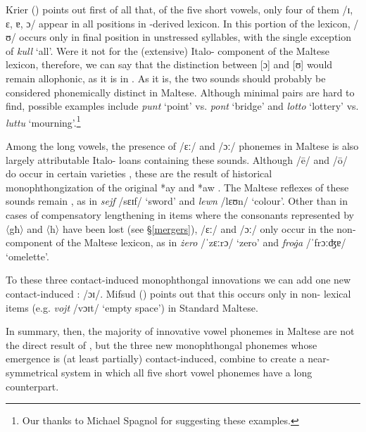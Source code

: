\documentclass[output=paper]{langsci/langscibook}
\begin{document}
Krier (\citeyear[21]{krier1976}) points out first of all that, of the five short vowels, only four of them /ɪ, ɛ, ɐ, ɔ/ appear in all positions in -derived lexicon. In this portion of the lexicon, /ʊ/ occurs only in final position in unstressed syllables, with the single exception of \textit{kull} `all'. Were it not for the (extensive) Italo- component of the Maltese lexicon, therefore, we can say that the distinction between [ɔ] and [ʊ] would remain allophonic, as it is in  . As it is, the two sounds should probably be considered phonemically distinct in Maltese. Although minimal pairs are hard to find, possible examples include \textit{punt} `point' vs. \textit{pont} `bridge' and \textit{lotto} `lottery' vs. \textit{luttu} `mourning'.\footnote{Our thanks to Michael Spagnol for suggesting these examples.}


Among the long vowels, the presence of /ɛː/ and /ɔː/ phonemes in Maltese is also largely attributable Italo- loans containing these sounds. Although /\={e}/ and /\={o}/ do occur in certain   varieties \citep{Gibson2011,HerinZammit2017}, these are the result of historical monophthongization of the original *ay and *aw . The Maltese reflexes of these sounds remain , as in \textit{sejf} /sɛɪf/ `sword' and \textit{lewn} /lɛʊn/ `colour'. Other than in cases of compensatory lengthening in items where the consonants represented by 〈għ〉 and 〈h〉 have been lost (see §\ref{mergers}), /ɛː/ and /ɔː/ only occur in the non- component of the Maltese lexicon, as in \textit{żero} /ˈzɛːrɔ/ `zero' and \textit{froġa} /ˈfrɔːʤɐ/ `omelette'.

To these three contact-induced monophthongal innovations we can add one new contact-induced : /ɔɪ/. Mifsud (\citeyear{mifsud2011}) points out that this occurs only in non- lexical items (e.g. \textit{vojt} /vɔɪt/ `empty space') in  Standard Maltese.

In summary, then, the majority of innovative vowel phonemes in Maltese are not the direct result of , but the three new monophthongal phonemes whose emergence is (at least partially) contact-induced, combine to create a near-symmetrical system in which all five short vowel phonemes have a long counterpart.
\end{document}
